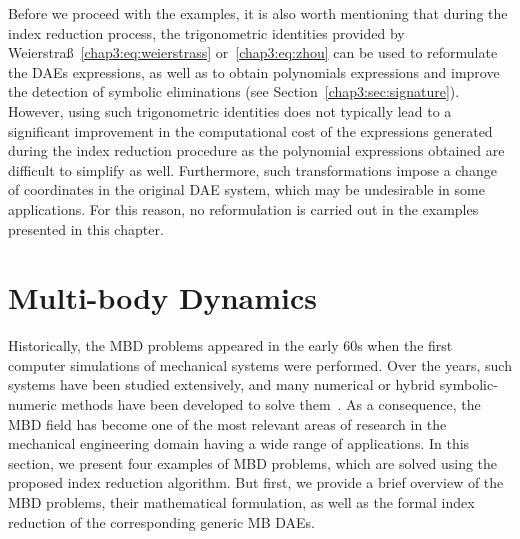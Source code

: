 Before we proceed with the examples, it is also worth mentioning that during the index reduction process, the trigonometric identities provided by Weierstra{\ss}~\eqref{chap3:eq:weierstrass} or~\eqref{chap3:eq:zhou} can be used to reformulate the \acp{DAE} expressions, as well as to obtain polynomials expressions and improve the detection of symbolic eliminations (see Section~\ref{chap3:sec:signature}). However, using such trigonometric identities does not typically lead to a significant improvement in the computational cost of the expressions generated during the index reduction procedure as the polynomial expressions obtained are difficult to simplify as well. Furthermore, such transformations impose a change of coordinates in the original \ac{DAE} system, which may be undesirable in some applications. For this reason, no reformulation is carried out in the examples presented in this chapter.

\section{Multi-body Dynamics}
\label{chap5:sec:mbd}

Historically, the \ac{MBD} problems appeared in the early 60s when the first computer simulations of mechanical systems were performed. Over the years, such systems have been studied extensively, and many numerical or hybrid symbolic-numeric methods have been developed to solve them~\cite{dejalon1994kinematic}. As a consequence, the \ac{MBD} field has become one of the most relevant areas of research in the mechanical engineering domain having a wide range of applications. In this section, we present four examples of \ac{MBD} problems, which are solved using the proposed index reduction algorithm. But first, we provide a brief overview of the \ac{MBD} problems, their mathematical formulation, as well as the formal index reduction of the corresponding generic \ac{MB} \acp{DAE}.

